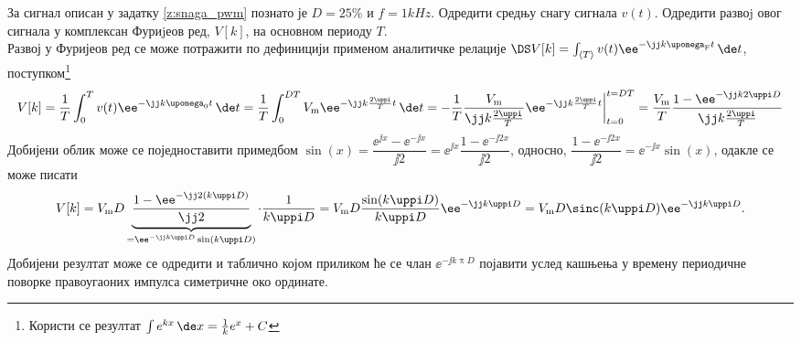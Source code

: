 \PID 
За сигнал описан у задатку \ref{z:snaga_pwm} познато је 
$D = 25\%$ и $f = 1\unit{kHz}$. Одредити средњу снагу сигнала $v(t)$.
Одредити развоj овог сигнала у комплексан Фуриjеов ред, $V[k]$, на основном периоду $T$.
\\[2mm]

\RESENJE  Развој у Фуријеов ред се може потражити по дефиницији применом 
аналитичке релације 
$\DS V[k] = \int_{\langle T \rangle} v(t) \ee^{-\jj k \upomega_{\rm F} t} \, \de t$, 
поступком\footnote{Користи се резултат $\int e^{kx} \, \de x = \frac{1}{k} e^x + C$}
\begin{align}
    V[k] = \dfrac{1}{T} \int_{0}^T v(t) \ee^{-\jj k \upomega_{\rm 0} t} \, \de t 
         = \dfrac{1}{T} \int_{0}^{DT}  V_{\rm m} \ee^{-\jj k \frac{2\uppi}{T} t} \, \de t
         = - \dfrac{1}{T} \dfrac{V_{\rm m}}{\jj k \frac{2\uppi}{T}} 
         \ee^{-\jj k \frac{2\uppi}{T} t}\bigg|_{t = 0}^{t = DT}
         = \dfrac{V_{\rm m}}{T} \dfrac{
            1
            -
            \ee^{-\jj k 2\uppi D}
         }{\jj k \frac{2\uppi}{T}} 
\end{align}
Добијени облик може се поједноставити примедбом 
$\sin(x) = \dfrac{\ee^{\jj x} - \ee^{-\jj x}}{\jj 2} = \ee^{\jj x} \dfrac{1 - \ee^{-\jj 2x}}{\jj 2}$,
односно, 
$\dfrac{1 - \ee^{-\jj 2x}}{\jj 2} = \ee^{-\jj x} \sin(x) $,
одакле се може писати
\begin{align}
    V[k] = V_{\rm m}D 
     \underbrace{
     \dfrac{
        1
        -
        \ee^{-\jj 2 (k \uppi D) }
     }{\jj 2 }}_{ = \ee^{-\jj k \uppi D} \sin(k\uppi D) }
     \cdot 
     \dfrac{1}{k \uppi D} 
     = V_{\rm m} D \dfrac{\sin(k\uppi D)}{k\uppi D} \ee^{-\jj k \uppi D} 
     = V_{\rm m} D \sinc(k \uppi D) \ee^{-\jj k \uppi D}.
\end{align}
Добијени резултат може се одредити и таблично којом приликом ће се члан 
$\ee^{-\jj k \uppi D}$ појавити услед кашњења у времену периодичне поворке правоугаоних 
импулса симетричне око ординате. 
